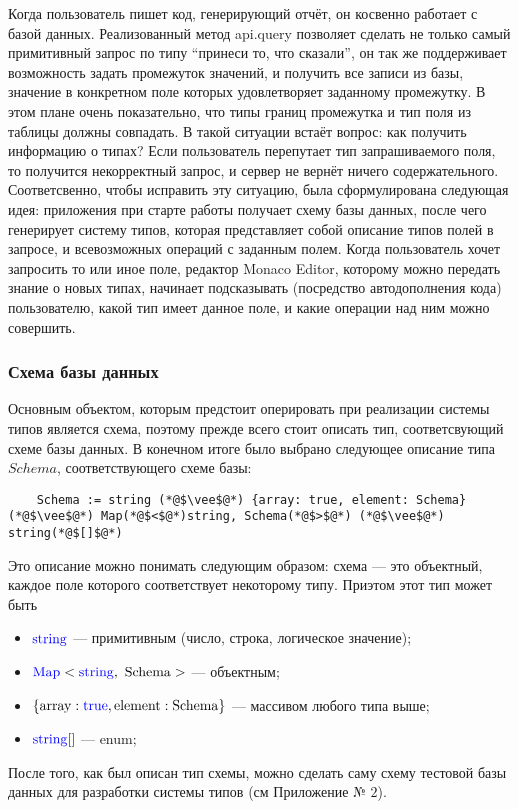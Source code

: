 \documentclass[12pt]{article}
\begin{document}
    Когда пользователь пишет код, генерирующий отчёт, он косвенно работает с базой данных. Реализованный метод api.query позволяет сделать не только самый
    примитивный запрос по типу ``принеси то, что сказали'', он так же поддерживает возможность задать промежуток значений, и получить все записи из базы,
    значение в конкретном поле которых удовлетворяет заданному промежутку. В этом плане очень показательно, что типы границ промежутка и тип поля из таблицы
    должны совпадать. В такой ситуации встаёт вопрос: как получить информацию о типах? Если пользователь перепутает тип запрашиваемого поля, то получится
    некорректный запрос, и сервер не вернёт ничего содержательного. Соответсвенно, чтобы исправить эту ситуацию, была сформулирована следующая идея:
    приложения при старте работы получает схему базы данных, после чего генерирует систему типов, которая представляет собой
    описание типов полей в запросе, и всевозможных операций с заданным полем. Когда пользователь хочет запросить то или иное поле, редактор Monaco Editor,
    которому можно передать знание о новых типах, начинает подсказывать (посредство автодополнения кода) пользователю, какой тип имеет данное поле,
    и какие операции над ним можно совершить.

    \subsubsection{Схема базы данных}

    Основным объектом, которым предстоит оперировать при реализации системы типов является схема, поэтому прежде всего стоит описать тип, соответсвующий схеме
    базы данных. В конечном итоге было выбрано следующее описание типа $Schema$, соответствующего схеме базы:
    \begin{center}
        \begin{lstlisting}
    Schema := string (*@$\vee$@*) {array: true, element: Schema} (*@$\vee$@*) Map(*@$<$@*)string, Schema(*@$>$@*) (*@$\vee$@*) string(*@$[]$@*)
        \end{lstlisting}
    \end{center}
    Это описание можно понимать следующим образом: схема --- это объектный, каждое поле которого соответствует некоторому типу.
    Приэтом этот тип может быть
    \begin{itemize}
        \item $\textcolor{blue}{\mathrm{string}}$ --- примитивным (число, строка, логическое значение);
        \item $\textcolor{blue}{\mathrm{Map}}<\textcolor{blue}{\mathrm{string}},~ \mathrm{Schema}>$ --- объектным;
        \item $\{\mathrm{array}: \textcolor{blue}{\mathrm{true}}, \mathrm{element}: \mathrm{Schema}\}$ --- массивом любого типа выше;
        \item $\textcolor{blue}{\mathrm{string}}[]$ --- enum;
    \end{itemize}
    После того, как был описан тип схемы, можно сделать саму схему тестовой базы данных для разработки системы типов (см Приложение № $2$).
\end{document}
